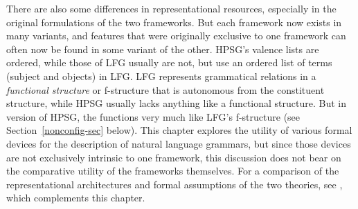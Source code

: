 There are also some differences in representational resources, especially in the original formulations of the two frameworks.
But each framework now exists in many variants, and features that were originally exclusive to one framework can often now be found in some variant of the other.   HPSG's valence lists are ordered, while those of LFG usually are not, but \citet{andrews1999complex} use an ordered list of terms (subject and objects) in LFG.  
LFG represents grammatical relations in a \textit{functional structure} or f-structure that is autonomous from the constituent structure, while HPSG usually lacks anything like a functional structure. 
But in  
version of HPSG, the \compsl functions very much like LFG's f-structure (see Section~\ref{nonconfig-sec} below).  This chapter explores the utility of various formal devices for the description of natural language grammars, but since those devices are not exclusively intrinsic to one framework, this discussion does not bear on the comparative utility of the frameworks themselves. For a comparison of the representational architectures and formal assumptions of the two theories, see \citet{Przepiorkowski2021a}, which complements this chapter. 


